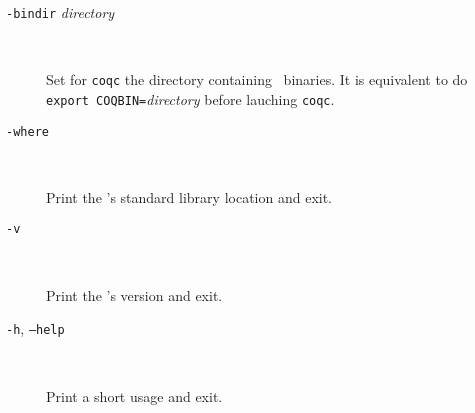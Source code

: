 \begin{description}
\item[{\tt -bindir} {\em directory}]\ 

  Set for {\tt coqc} the directory containing \Coq\ binaries.
  It is equivalent to do \texttt{export COQBIN=}{\em directory}
  before lauching {\tt coqc}.

\item[{\tt -where}]\ 

  Print the \Coq's standard library location and exit.

\item[{\tt -v}]\ 

  Print the \Coq's version and exit.

\item[{\tt -h}, {\tt --help}]\ 

  Print a short usage and exit.

\end{description}




